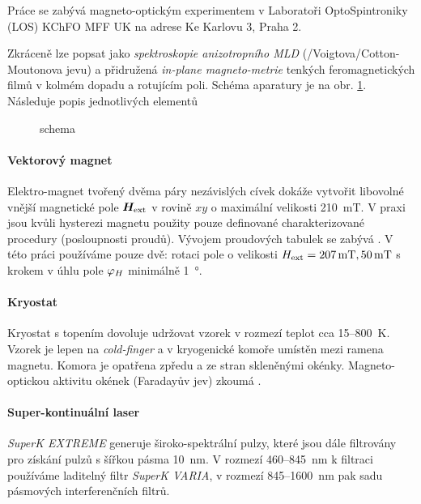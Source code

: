Práce se zabývá magneto-optickým experimentem v Laboratoři OptoSpintroniky (LOS) KChFO MFF UK na adrese Ke Karlovu 3, Praha 2.

Zkráceně lze popsat jako \emph{spektroskopie anizotropního MLD} (/Voigtova/Cotton-Moutonova jevu) a přidružená \emph{in-plane magneto-metrie} tenkých feromagnetických filmů v kolmém dopadu a rotujícím poli.
Schéma aparatury je na obr. \ref{fig:zakladni-schema}.
Následuje popis jednotlivých elementů

\begin{figure}[htbp]
    \centering
    
    \caption{schema}
    \label{fig:zakladni-schema}
\end{figure}

\paragraph{Vektorový magnet}
Elektro-magnet tvořený dvěma páry nezávislých cívek dokáže vytvořit libovolné vnější magnetické pole $\bm{H}_\textrm{ext}$ v rovině $xy$ o maximální velikosti \SI{210}{\milli\tesla}.
V praxi jsou kvůli hysterezi magnetu použity pouze definované charakterizované procedury (posloupnosti proudů).
Vývojem proudových tabulek se zabývá \cite{kimakCharakterizaciaDvojdimenzionalnehoElektromagnetu2017,kimakOptickaSpektroskopieAntiferomagnetu2019}.
V této práci používáme pouze dvě: rotaci pole o velikosti $H_\textrm{ext}=\SI{207}{\milli\tesla}, \SI{50}{\milli\tesla}$ s krokem v úhlu pole $\varphi_H$ minimálně \SI{1}{\degree}.

\paragraph{Kryostat}
Kryostat s topením dovoluje udržovat vzorek v rozmezí teplot cca 15--\SI{800}{\kelvin}.
Vzorek je lepen na \emph{cold-finger} a v kryogenické komoře umístěn mezi ramena magnetu.
Komora je opatřena zpředu a ze stran skleněnými okénky.
Magneto-optickou aktivitu okének (Faradayův jev) zkoumá \cite{baduraMagnetooptickaMereniPro2019}.

\paragraph{Super-kontinuální laser}
\emph{SuperK EXTREME} generuje široko-spektrální pulzy, které jsou dále filtrovány pro získání pulzů s šířkou pásma \SI{10}{\nano\meter}.
V rozmezí \num{460}--\SI{845}{\nano\meter} k filtraci používáme laditelný filtr \emph{SuperK VARIA}, v rozmezí \num{845}--\SI{1600}{\nano\meter} pak sadu pásmových interferenčních filtrů.

